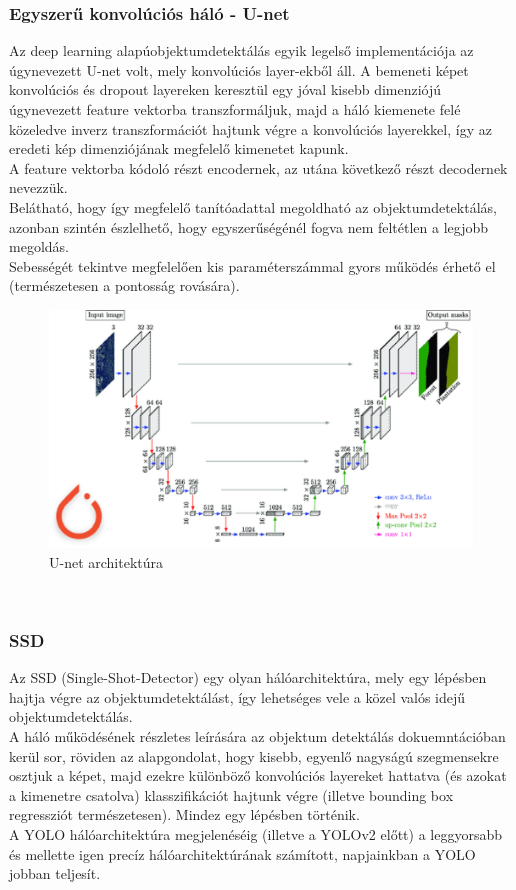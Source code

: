 \documentclass{article}
\begin{document}
\subsubsection{Egyszerű konvolúciós háló - U-net}
Az deep learning alapúobjektumdetektálás egyik legelső implementációja 
az úgynevezett U-net volt, mely konvolúciós layer-ekből áll. 
A bemeneti képet konvolúciós és dropout layereken keresztül 
egy jóval kisebb dimenziójú úgynevezett feature vektorba 
transzformáljuk, majd a háló kiemenete felé közeledve inverz 
transzformációt hajtunk végre a konvolúciós layerekkel, így 
az eredeti kép dimenziójának megfelelő kimenetet kapunk.\\[5pt]
A feature vektorba kódoló részt encodernek, az utána következő 
részt decodernek nevezzük.\\
Belátható, hogy így megfelelő tanítóadattal megoldható 
az objektumdetektálás, azonban szintén észlelhető, hogy 
egyszerűségénél fogva nem feltétlen a legjobb megoldás.\\[5pt]
Sebességét tekintve megfelelően kis paraméterszámmal 
gyors működés érhető el (természetesen a pontosság rovására).
\begin{figure}[h]
    \centering
    \includegraphics[scale = 0.6]{unet.png}
    \caption{U-net architektúra}
\end{figure} \\
\subsubsection{SSD}
Az SSD (Single-Shot-Detector) egy olyan hálóarchitektúra, mely egy lépésben 
hajtja végre az objektumdetektálást, így lehetséges vele a közel valós 
idejű objektumdetektálás.\\[5pt]
A háló működésének részletes leírására az objektum detektálás dokuemntációban 
kerül sor, röviden az alapgondolat, hogy kisebb, egyenlő nagyságú 
szegmensekre osztjuk a képet, majd ezekre különböző konvolúciós layereket 
hattatva (és azokat a kimenetre csatolva) klasszifikációt hajtunk végre 
(illetve bounding box regressziót természetesen). Mindez egy lépésben történik.\\[5pt]
A YOLO hálóarchitektúra megjelenéséig (illetve a YOLOv2 előtt) a leggyorsabb 
és mellette igen precíz hálóarchitektúrának számított, napjainkban a 
YOLO jobban teljesít.
\end{document}
